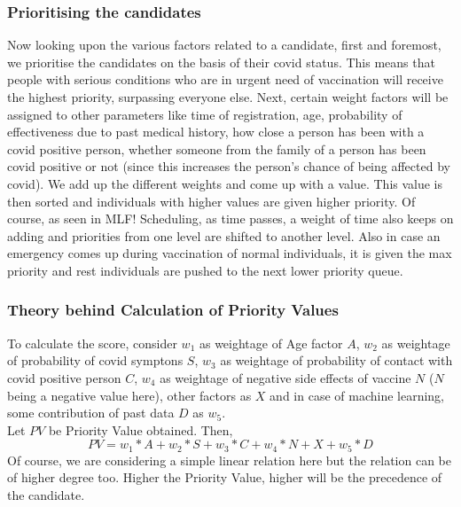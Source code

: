\documentclass[10pt,twocolumn,letterpaper]{article}
\begin{document}
\subsubsection{Prioritising the candidates}
Now looking upon the various factors related to a candidate, first and foremost, we prioritise the candidates on the basis of their covid status. This means that people with serious conditions who are in urgent need of vaccination will receive the highest priority, surpassing everyone else. Next, certain weight factors will be assigned to other parameters like time of registration, age, probability of effectiveness due to past medical history, how close a person has been with a covid positive person, whether someone from the family of a person has been covid positive or not (since this increases the person’s chance of being affected by covid). We add up the different weights and come up with a value. This value is then sorted and individuals with higher values are given higher priority. Of course, as seen in MLF! Scheduling, as time passes, a weight of time also keeps on adding and priorities from one level are shifted to another level. Also in case an emergency comes up during vaccination of normal individuals, it is given the max priority and rest individuals are pushed to the next lower priority queue.

\subsubsection{Theory behind Calculation of Priority Values}
To calculate the score, consider $w_{1}$ as weightage of Age factor $A$, $w_{2}$ as weightage of probability of covid symptons $S$, $w_{3}$ as weightage of probability of contact with covid positive person $C$, $w_{4}$ as weightage of negative side effects of vaccine $N$ ($N$ being a negative value here), other factors as $X$ and in case of machine learning, some contribution of past data $D$ as $w_{5}$.
\\Let $PV$ be Priority Value obtained. Then,
\begin{equation}
	PV = {w_{1}*A + w_{2}*S + w_{3}*C + w_{4}*N + X + w_{5}*D} 
\end{equation}
Of course, we are considering a simple linear relation here but the relation can be of higher degree too. Higher the Priority Value, higher will be the precedence of the candidate.
\end{document}
